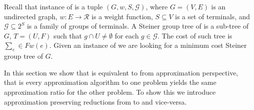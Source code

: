 Recall that instance of \ProbGroup{} is a tuple $(G, w, S, \mathcal{G})$,
where $G = (V, E)$ is an undirected graph, $w:E \to \mathcal{R}$ is a weight function, 
$S \subseteq V$ is a set of terminals, and $\mathcal{G} \subseteq 2^S$ is a family of 
groups of terminals.
A Steiner group tree of is a sub-tree of $G$, $T = (U, F)$
such that $g \cap U \neq \emptyset$ for each $g \in \mathcal{G}$.
The cost of such tree is $\sum_e \in F w(e)$.
Given an instance of \ProbGroup{} we are looking for a minimum cost Steiner group tree
of $G$.

In this section we show that \Prob{} is equivalent to \ProbGroup{} from 
approximation perspective, 
that is every approximation algorithm to one problem yields the same approximation 
ratio for the other problem.
To show this we introduce approximation preserving reductions from \Prob{} to \ProbGroup{}
and vice-versa. 

